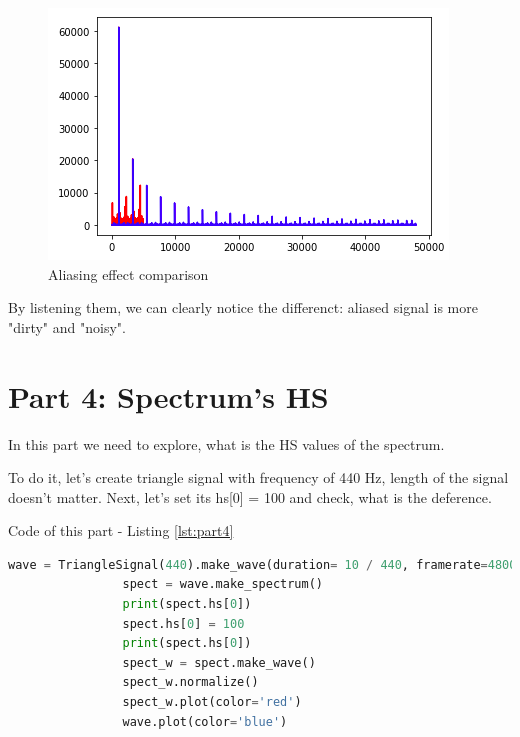 \documentclass[a4paper]{article}
\begin{document}
        \begin{figure}[H]
            \centering
            \includegraphics[width=\textwidth]{img/als_clear.png}
            \caption{Aliasing effect comparison}
            \label{fig:als_clr}
        \end{figure}
            
        By listening them, we can clearly notice the differenct: aliased signal is more "dirty" and "noisy".
            
    \newpage
        \section{Part 4: Spectrum's HS}
        
            In this part we need to explore, what is the HS values of the spectrum.
            
            To do it, let's create triangle signal with frequency of 440 Hz, length of the signal doesn't matter. Next, let's set its hs[0] = 100 and check, what is the deference.
            
            Code of this part - Listing \ref{lst:part4}
            
            \begin{lstlisting}[language=Python,caption=HS operations,label={lst:part4}]
                wave = TriangleSignal(440).make_wave(duration= 10 / 440, framerate=48000)
                spect = wave.make_spectrum()
                print(spect.hs[0])
                spect.hs[0] = 100
                print(spect.hs[0])
                spect_w = spect.make_wave()
                spect_w.normalize()
                spect_w.plot(color='red')
                wave.plot(color='blue')
            \end{lstlisting}
            
\end{document}
